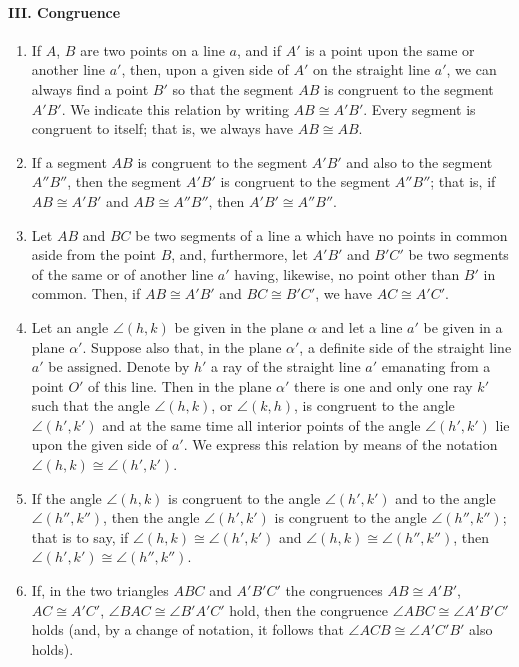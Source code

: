 \documentclass{ximera}
\begin{document}
\paragraph{III. Congruence}
\begin{enumerate}

\item If $A$, $B$ are two points on a line $a$, and if $A'$ is a point upon
  the same or another line $a'$, then, upon a given side of $A'$ on the
  straight line $a'$, we can always find a point $B'$ so that the segment
  $AB$ is congruent to the segment $A'B'$. We indicate this relation by
  writing $AB \cong A' B'$. Every segment is congruent to itself; that is,
  we always have $AB\cong AB$.

\item If a segment $AB$ is congruent to the segment $A'B'$ and also to the
  segment $A''B''$, then the segment $A'B'$ is congruent to the segment
  $A''B''$; that is, if $AB \cong A'B'$ and $AB \cong A''B''$, then $A'B'\cong A''B''$.

\item Let $AB$ and $BC$ be two segments of a line a which have no
  points in common aside from the point $B$, and, furthermore, let
  $A'B'$ and $B'C'$ be two segments of the same or of another line
  $a'$ having, likewise, no point other than $B'$ in common. Then, if
  $AB \cong A'B'$ and $BC \cong B'C'$, we have $AC \cong A'C'$.

\item Let an angle $\angle (h,k)$ be given in the plane $\alpha$ and let a
  line $a'$ be given in a plane $\alpha'$. Suppose also that, in the plane
  $\alpha'$, a definite side of the straight line $a'$ be assigned. Denote
  by $h'$ a ray of the straight line $a'$ emanating from a point $O'$ of
  this line. Then in the plane $\alpha'$ there is one and only one ray
  $k'$ such that the angle $\angle (h, k)$, or $\angle (k, h)$, is congruent
  to the angle $\angle (h', k')$ and at the same time all interior
  points of the angle $\angle (h', k')$ lie upon the given side of
  $a'$. We express this relation by means of the notation $\angle (h, k)
  \cong \angle (h', k')$.

\item If the angle $\angle (h, k)$ is congruent to the angle $\angle
  (h', k')$ and to the angle $\angle (h'', k'')$, then the angle
  $\angle (h', k')$ is congruent to the angle $\angle (h'', k'')$;
  that is to say, if $\angle (h, k) \cong \angle (h', k')$ and $\angle
  (h, k) \cong \angle (h'', k'')$, then $\angle (h', k') \cong \angle
  (h'', k'')$.

\item If, in the two triangles $ABC$ and $A'B'C'$ the congruences $AB
  \cong A'B'$, $AC \cong A'C'$, $\angle BAC \cong \angle B'A'C'$ hold,
  then the congruence $\angle ABC \cong \angle A'B'C'$ holds (and, by a
  change of notation, it follows that $\angle ACB \cong \angle A'C'B'$
  also holds).
\end{enumerate}
\end{document}
